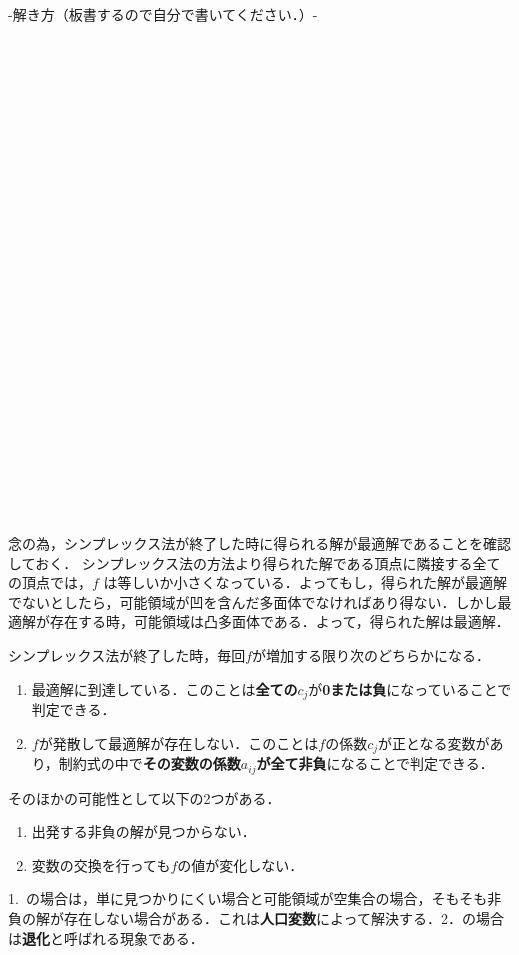 \documentclass[dvipdfmx,autodetect-engine]{jsarticle}
\begin{document}
-解き方（板書するので自分で書いてください．）-
\\
\\
\\
\\
\\
\\
\\
\\
\\
\\
\\
\\
\\
\\
\\
\\
\\
\\
\\
\\
\\
\\
\\
\\
\\
\\
\\

念の為，シンプレックス法が終了した時に得られる解が最適解であることを確認しておく．
シンプレックス法の方法より得られた解である頂点に隣接する全ての頂点では，$f$ は等しいか小さくなっている．よってもし，得られた解が最適解でないとしたら，可能領域が凹を含んだ多面体でなければあり得ない．しかし最適解が存在する時，可能領域は凸多面体である．よって，得られた解は最適解．


シンプレックス法が終了した時，毎回$f$が増加する限り次のどちらかになる．
\begin{enumerate}
\item 最適解に到達している．このことは\textbf{全ての$c_{j}$}が\textbf{0または負}になっていることで判定できる．
\item $f$が発散して最適解が存在しない．このことは$f$の係数$c_{j}$が正となる変数があり，制約式の中で\textbf{その変数の係数$a_{ij}$が全て非負}になることで判定できる．
\end{enumerate}
そのほかの可能性として以下の2つがある．
\begin{enumerate}
\item 出発する非負の解が見つからない．
\item 変数の交換を行っても$f$の値が変化しない．
\end{enumerate}
1. の場合は，単に見つかりにくい場合と可能領域が空集合の場合，そもそも非負の解が存在しない場合がある．これは\textbf{人口変数}によって解決する．2．の場合は\textbf{退化}と呼ばれる現象である．
\end{document}
